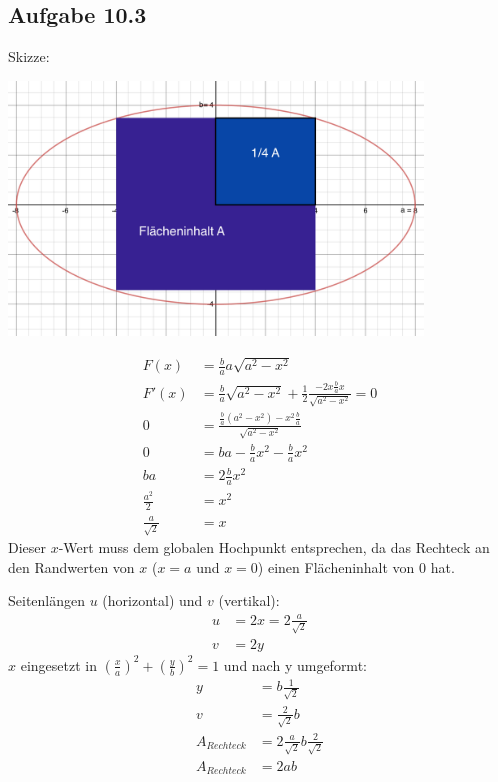 \documentclass{standalone}
\begin{document}
\subsection{Aufgabe 10.3}
Skizze: \begin{center}
\includegraphics[width=11cm]{img/uebung10_a3.png}\end{center}
\begin{align}
F(x) &= \frac{b}{a} a \sqrt{a^2 - x^2} \\
F'(x) &= \frac{b}{a} \sqrt{a^2 - x^2} + \frac{1}{2}\frac{-2x \frac{b}{a}x}{\sqrt{a^2 -x^2}} = 0 \\
0 &= \frac{\frac{b}{a} (a^2 - x^2) - x^2 \frac{b}{a}}{\sqrt{a^2 - x^2}} \\
0 &=ba - \frac{b}{a} x^2 - \frac{b}{a} x^2 \\
ba &= 2 \frac{b}{a} x^2 \\
\frac{a^2}{2} &= x^2 \\
\frac{a}{\sqrt{2}} &= x
\end{align}
Dieser $x$-Wert muss dem globalen Hochpunkt entsprechen, da das Rechteck an den Randwerten von $x$ ($x = a$ und $x = 0$) einen Flächeninhalt von $0$ hat.

Seitenlängen $u$ (horizontal) und $v$ (vertikal):
\begin{align}
u &= 2x = 2 \frac{a}{\sqrt{2}} \\
v &= 2y
\end{align}
$x$ eingesetzt in $(\frac{x}{a})^2 + (\frac{y}{b})^2 = 1$ und nach y umgeformt:
\begin{align}
y &= b \frac{1}{\sqrt{2}} \\
v &= \frac{2}{\sqrt{2}} b \\
A_{Rechteck} &= 2 \frac{a}{\sqrt{2}} b \frac{2}{\sqrt{2}} \\
A_{Rechteck} &= 2ab
\end{align}
\end{document}
